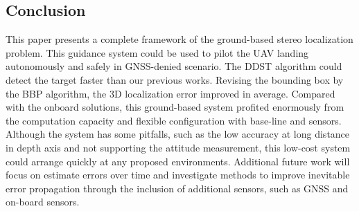 \documentclass[journal,article,submit,moreauthors,pdftex,10pt,a4paper]{mdpi}
\begin{document}
\begin{table}[!th]
	\centering
	\caption{UAV 3D Localization Error with Tracking Algorithms}
	\label{lab:3D_Error_Algorithms}
\end{table}


\subsection{Conclusion}
This paper presents a complete framework of the ground-based stereo localization problem. This guidance system could be used to pilot the UAV landing autonomously and safely in GNSS-denied scenario. The DDST algorithm could detect the target faster than our previous works. Revising the bounding box by the BBP algorithm, the 3D localization error improved in average. Compared with the onboard solutions, this ground-based system profited enormously from the computation capacity and flexible configuration with base-line and sensors. Although the system has some pitfalls, such as the low accuracy at long distance in depth axis and not supporting the attitude measurement, this low-cost system could arrange quickly at any proposed environments. Additional future work will focus on estimate errors over time and investigate methods to improve inevitable error propagation through the inclusion of additional sensors, such as GNSS and on-board sensors.
\end{document}
